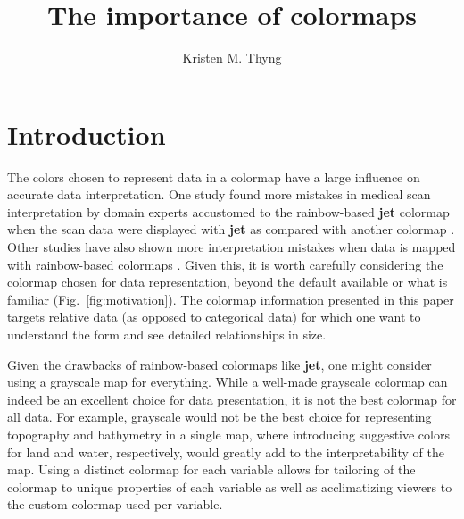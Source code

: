 \documentclass[10pt,journal,compsoc]{IEEEtran}
\begin{document}
\title{The importance of colormaps}



\author{%
	Kristen M. Thyng
	}




\maketitle


\section{Introduction}

The colors chosen to represent data in a colormap have a large influence on accurate data interpretation. One study found more mistakes in medical scan interpretation by domain experts accustomed to the rainbow-based \textbf{jet} colormap when the scan data were displayed with \textbf{jet} as compared with another colormap \citep{Spence:1999ea}. Other studies have also shown more interpretation mistakes when data is mapped with rainbow-based colormaps  \citep{borkin2011evaluation,Bryant:2014bh}. Given this, it is worth carefully considering the colormap chosen for data representation, beyond the default available or what is familiar (Fig.~\ref{fig:motivation}). The colormap information presented in this paper targets relative data (as opposed to categorical data) for which one want to understand the form and see detailed relationships in size.

Given the drawbacks of rainbow-based colormaps like \textbf{jet}, one might consider using a grayscale map for everything. While a well-made grayscale colormap can indeed be an excellent choice for data presentation, it is not the best colormap for all data. For example, grayscale would not be the best choice for representing topography and bathymetry in a single map, where introducing suggestive colors for land and water, respectively, would greatly add to the interpretability of the map. Using a distinct colormap for each variable allows for tailoring of the colormap to unique properties of each variable as well as acclimatizing viewers to the custom colormap used per variable.
\end{document}

